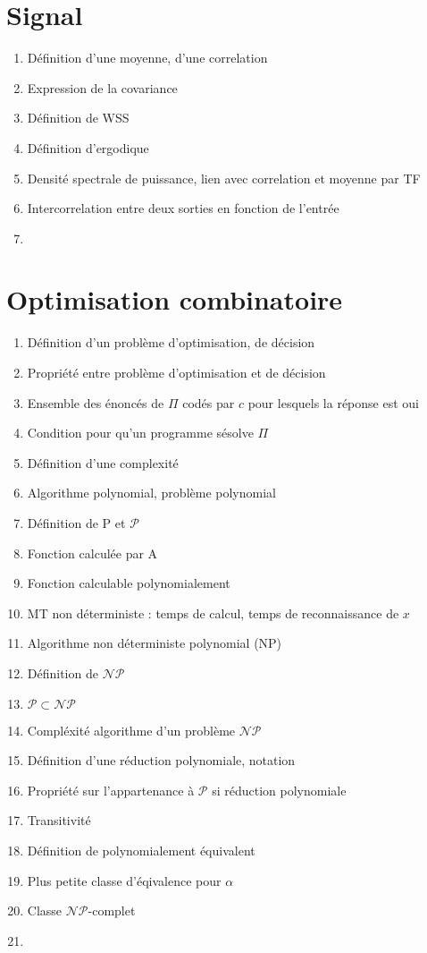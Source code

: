 \documentclass{article}
\begin{document}
\setcounter{tocdepth}{4}
\tableofcontents
\newpage

\part{Signal}
\begin{enumerate}
\item Définition d'une moyenne, d'une correlation
\item Expression de la covariance
\item Définition de WSS
\item Définition d'ergodique
\item Densité spectrale de puissance, lien avec correlation et moyenne par TF
\item Intercorrelation entre deux sorties en fonction de l'entrée
\item 
\end{enumerate}

\part{Optimisation combinatoire}
\begin{enumerate}
\item Définition d'un problème d'optimisation, de décision
\item Propriété entre problème d'optimisation et de décision
\item Ensemble des énoncés de $\Pi$ codés par $c$ pour lesquels la réponse est oui
\item Condition pour qu'un programme sésolve $\Pi$
\item Définition d'une complexité
\item Algorithme polynomial, problème polynomial
\item Définition de P et $\mathcal{P}$
\item Fonction calculée par A
\item Fonction calculable polynomialement
\item MT non déterministe : temps de calcul, temps de reconnaissance de $x$
\item Algorithme non déterministe polynomial (NP)
\item Définition de $\mathcal{N}\mathcal{P}$
\item $\mathcal{P}\subset\mathcal{N}\mathcal{P}$
\item Compléxité algorithme d'un problème $\mathcal{NP}$
\item Définition d'une réduction polynomiale, notation
\item Propriété sur l'appartenance à $\mathcal{P}$ si réduction polynomiale
\item Transitivité
\item Définition de polynomialement équivalent
\item Plus petite classe d'éqivalence pour $\alpha$
\item Classe $\mathcal{NP}$-complet
\item 
\end{enumerate}
\end{document}

